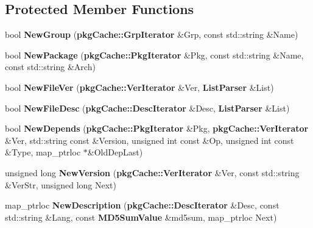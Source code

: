 \subsection*{\-Protected \-Member \-Functions}
\begin{DoxyCompactItemize}
\item 
bool {\bfseries \-New\-Group} ({\bf pkg\-Cache\-::\-Grp\-Iterator} \&\-Grp, const std\-::string \&\-Name)\label{classpkgCacheGenerator_ac1554f5679aa87ca64d9aefd631ad44d}

\item 
bool {\bfseries \-New\-Package} ({\bf pkg\-Cache\-::\-Pkg\-Iterator} \&\-Pkg, const std\-::string \&\-Name, const std\-::string \&\-Arch)\label{classpkgCacheGenerator_a8b198a03e347648de2c1b27c8ea3d05d}

\item 
bool {\bfseries \-New\-File\-Ver} ({\bf pkg\-Cache\-::\-Ver\-Iterator} \&\-Ver, {\bf \-List\-Parser} \&\-List)\label{classpkgCacheGenerator_ab8e6d0f2a965b59711f7b43591e7ab5f}

\item 
bool {\bfseries \-New\-File\-Desc} ({\bf pkg\-Cache\-::\-Desc\-Iterator} \&\-Desc, {\bf \-List\-Parser} \&\-List)\label{classpkgCacheGenerator_aeacb93a595d6cd2812f730dfe22de8b5}

\item 
bool {\bfseries \-New\-Depends} ({\bf pkg\-Cache\-::\-Pkg\-Iterator} \&\-Pkg, {\bf pkg\-Cache\-::\-Ver\-Iterator} \&\-Ver, std\-::string const \&\-Version, unsigned int const \&\-Op, unsigned int const \&\-Type, map\-\_\-ptrloc $\ast$\&\-Old\-Dep\-Last)\label{classpkgCacheGenerator_ad35ebe6927bd97a6d264f4361fa765ec}

\item 
unsigned long {\bfseries \-New\-Version} ({\bf pkg\-Cache\-::\-Ver\-Iterator} \&\-Ver, const std\-::string \&\-Ver\-Str, unsigned long \-Next)\label{classpkgCacheGenerator_ac6de5dcba7a029e2f81059b5d810ed8f}

\item 
map\-\_\-ptrloc {\bfseries \-New\-Description} ({\bf pkg\-Cache\-::\-Desc\-Iterator} \&\-Desc, const std\-::string \&\-Lang, const {\bf \-M\-D5\-Sum\-Value} \&md5sum, map\-\_\-ptrloc \-Next)\label{classpkgCacheGenerator_a1b99e1306a673e4f2a061db464221804}

\end{DoxyCompactItemize}
